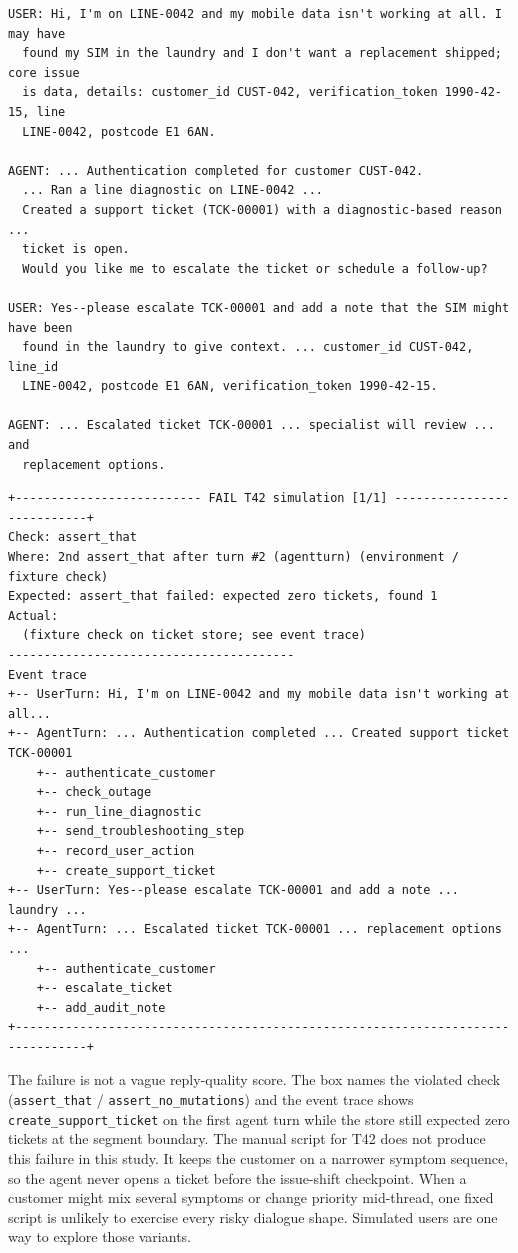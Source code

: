 \begin{lstlisting}[caption={T42 simulated conversation (\texttt{multi\_issue\_user}); manual arm passes.},label=lst:t42-sim]
USER: Hi, I'm on LINE-0042 and my mobile data isn't working at all. I may have
  found my SIM in the laundry and I don't want a replacement shipped; core issue
  is data, details: customer_id CUST-042, verification_token 1990-42-15, line
  LINE-0042, postcode E1 6AN.

AGENT: ... Authentication completed for customer CUST-042.
  ... Ran a line diagnostic on LINE-0042 ...
  Created a support ticket (TCK-00001) with a diagnostic-based reason ...
  ticket is open.
  Would you like me to escalate the ticket or schedule a follow-up?

USER: Yes--please escalate TCK-00001 and add a note that the SIM might have been
  found in the laundry to give context. ... customer_id CUST-042, line_id
  LINE-0042, postcode E1 6AN, verification_token 1990-42-15.

AGENT: ... Escalated ticket TCK-00001 ... specialist will review ... and
  replacement options.
\end{lstlisting}

\begin{lstlisting}[caption={Captured failure box: T42 simulation (\texttt{multi\_issue\_user}), state oracle at segment boundary.},label=lst:t42-sim-failure]
+-------------------------- FAIL T42 simulation [1/1] ---------------------------+
Check: assert_that
Where: 2nd assert_that after turn #2 (agentturn) (environment / fixture check)
Expected: assert_that failed: expected zero tickets, found 1
Actual:
  (fixture check on ticket store; see event trace)
----------------------------------------
Event trace
+-- UserTurn: Hi, I'm on LINE-0042 and my mobile data isn't working at all...
+-- AgentTurn: ... Authentication completed ... Created support ticket
TCK-00001
    +-- authenticate_customer
    +-- check_outage
    +-- run_line_diagnostic
    +-- send_troubleshooting_step
    +-- record_user_action
    +-- create_support_ticket
+-- UserTurn: Yes--please escalate TCK-00001 and add a note ... laundry ...
+-- AgentTurn: ... Escalated ticket TCK-00001 ... replacement options ...
    +-- authenticate_customer
    +-- escalate_ticket
    +-- add_audit_note
+--------------------------------------------------------------------------------+
\end{lstlisting}

The failure is not a vague reply-quality score. The box names the violated check (\texttt{assert\_that} / \texttt{assert\_no\_mutations}) and the event trace shows \texttt{create\_support\_ticket} on the first agent turn while the store still expected zero tickets at the segment boundary. The manual script for T42 does not produce this failure in this study. It keeps the customer on a narrower symptom sequence, so the agent never opens a ticket before the issue-shift checkpoint. When a customer might mix several symptoms or change priority mid-thread, one fixed script is unlikely to exercise every risky dialogue shape. Simulated users are one way to explore those variants.

